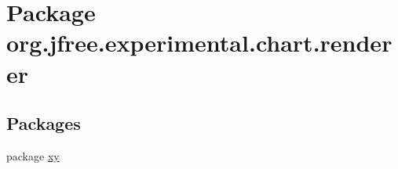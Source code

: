 \hypertarget{namespaceorg_1_1jfree_1_1experimental_1_1chart_1_1renderer}{}\section{Package org.\+jfree.\+experimental.\+chart.\+renderer}
\label{namespaceorg_1_1jfree_1_1experimental_1_1chart_1_1renderer}
\subsection*{Packages}
\begin{DoxyCompactItemize}
\item 
package \mbox{\hyperlink{namespaceorg_1_1jfree_1_1experimental_1_1chart_1_1renderer_1_1xy}{xy}}
\end{DoxyCompactItemize}
